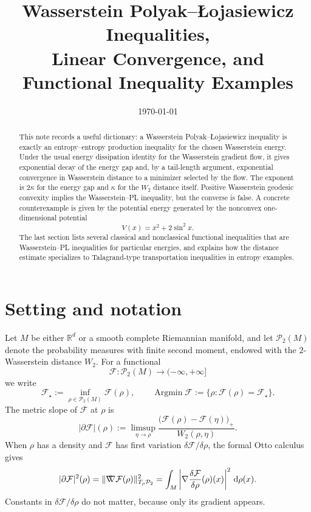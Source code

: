 \documentclass[11pt]{article}
\title{Wasserstein Polyak--{\L}ojasiewicz Inequalities,\\ Linear Convergence, and Functional Inequality Examples}
\author{}
\date{\today}
\theoremstyle{definition}
\newcommand{\Ptwo}{\mathcal P_2}
\newcommand{\F}{\mathcal F}
\newcommand{\W}{W_2}
\newcommand{\R}{\mathbb R}
\newcommand{\dd}{\,\mathrm d}
\newcommand{\gradW}{\mathord{\nabla\mkern-9.3mu\nabla}}
\begin{document}
\maketitle

\begin{abstract}
This note records a useful dictionary: a Wasserstein Polyak--{\L}ojasiewicz inequality is exactly an entropy--entropy production inequality for the chosen Wasserstein energy. Under the usual energy dissipation identity for the Wasserstein gradient flow, it gives exponential decay of the energy gap and, by a tail-length argument, exponential convergence in Wasserstein distance to a minimizer selected by the flow. The exponent is $2\kappa$ for the energy gap and $\kappa$ for the $W_2$ distance itself. Positive Wasserstein geodesic convexity implies the Wasserstein--PL inequality, but the converse is false. A concrete counterexample is given by the potential energy generated by the nonconvex one-dimensional potential
\[
        V(x)=x^2+2\sin^2 x.
\]
The last section lists several classical and nonclassical functional inequalities that are Wasserstein--PL inequalities for particular energies, and explains how the distance estimate specializes to Talagrand-type transportation inequalities in entropy examples.
\end{abstract}

\tableofcontents

\section{Setting and notation}

Let $M$ be either $\R^d$ or a smooth complete Riemannian manifold, and let
$\Ptwo(M)$ denote the probability measures with finite second moment, endowed with the $2$-Wasserstein distance $\W$.
For a functional
\[
        \F:\Ptwo(M)\to (-\infty,+\infty]
\]
we write
\[
        \F_\star := \inf_{\rho\in\Ptwo(M)}\F(\rho),
        \qquad
        \operatorname{Argmin}\F := \{\rho:\F(\rho)=\F_\star\}.
\]
The metric slope of $\F$ at $\rho$ is
\begin{equation}
        |\partial \F|(\rho)
        :=
        \limsup_{\eta\to \rho}
        \frac{\bigl(\F(\rho)-\F(\eta)\bigr)_+}{\W(\rho,\eta)}.
        \label{eq:metric-slope}
\end{equation}
When $\rho$ has a density and $\F$ has first variation $\delta \F/\delta\rho$, the formal Otto calculus gives
\begin{equation}
        |\partial \F|^2(\rho)
        = \|\gradW \F(\rho)\|_{T_\rho\Ptwo}^2
        = \int_M \left|\nabla \frac{\delta \F}{\delta \rho}(\rho)(x)\right|^2\dd \rho(x).
        \label{eq:slope-first-variation}
\end{equation}
Constants in $\delta\F/\delta\rho$ do not matter, because only its gradient appears.
\end{document}
